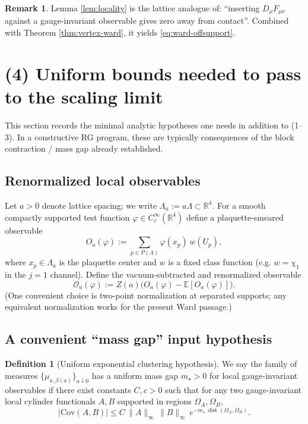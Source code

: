 \documentclass[11pt]{article}
\theoremstyle{definition}
\newtheorem{definition}[theorem]{Definition}
\newtheorem{remark}[theorem]{Remark}
\newcommand{\E}{\mathbb{E}}
\newcommand{\Cov}{\mathrm{Cov}}
\newcommand{\1}{\mathbf{1}}
\newcommand{\dist}{\operatorname{dist}}
\begin{document}
\begin{remark}
Lemma \ref{lem:locality} is the lattice analogue of: ``inserting $D_\mu F_{\mu\nu}$ against a gauge-invariant observable gives zero away from contact''.
Combined with Theorem \ref{thm:vertex-ward}, it yields \eqref{eq:ward-offsupport}.
\end{remark}

\section{(4) Uniform bounds needed to pass to the scaling limit}

This section records the minimal analytic hypotheses one needs in addition to (1--3).
In a constructive RG program, these are typically consequences of the block contraction / mass gap already established.

\subsection{Renormalized local observables}
Let $a>0$ denote lattice spacing; we write $\Lambda_a:=a\Lambda\subset \mathbb{R}^4$.
For a smooth compactly supported test function $\varphi\in C_c^\infty(\mathbb{R}^4)$ define a plaquette-smeared observable
\begin{equation}
  O_a(\varphi):=\sum_{p\in P(\Lambda)} \varphi(x_p)\, w(U_p),
\end{equation}
where $x_p\in \Lambda_a$ is the plaquette center and $w$ is a fixed class function (e.g. $w=\chi_1$ in the $j=1$ channel).
Define the vacuum-subtracted and renormalized observable
\begin{equation}\label{eq:renormO}
  \mathcal{O}_a(\varphi):=Z(a)\Big(O_a(\varphi)-\E[O_a(\varphi)]\Big).
\end{equation}
(One convenient choice is two-point normalization at separated supports; any equivalent normalization works for the present Ward passage.)

\subsection{A convenient ``mass gap'' input hypothesis}
\begin{definition}[Uniform exponential clustering hypothesis]\label{def:clustering}
We say the family of measures $\{\mu_{a,\beta(a)}\}_{a\downarrow 0}$ has a uniform mass gap $m_\star>0$ for local gauge-invariant observables if there exist constants $C,c>0$ such that for any two gauge-invariant local cylinder functionals $A,B$ supported in regions $\Omega_A,\Omega_B$,
\begin{equation}\label{eq:exp-cluster}
  \big|\Cov(A,B)\big| \le C\,\|A\|_{\infty}\,\|B\|_{\infty}\,e^{-m_\star\,\dist(\Omega_A,\Omega_B)}.
\end{equation}
\end{definition}
\end{document}
